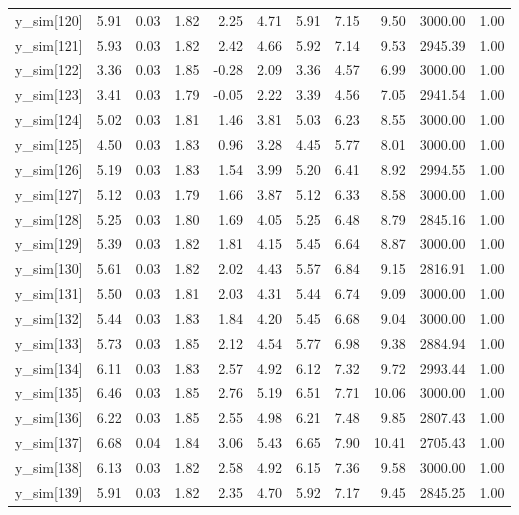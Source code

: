 \begin{table}[ht]
\begin{tabular}{rrrrrrrrrrr}
  y\_sim[120] & 5.91 & 0.03 & 1.82 & 2.25 & 4.71 & 5.91 & 7.15 & 9.50 & 3000.00 & 1.00 \\ 
  y\_sim[121] & 5.93 & 0.03 & 1.82 & 2.42 & 4.66 & 5.92 & 7.14 & 9.53 & 2945.39 & 1.00 \\ 
  y\_sim[122] & 3.36 & 0.03 & 1.85 & -0.28 & 2.09 & 3.36 & 4.57 & 6.99 & 3000.00 & 1.00 \\ 
  y\_sim[123] & 3.41 & 0.03 & 1.79 & -0.05 & 2.22 & 3.39 & 4.56 & 7.05 & 2941.54 & 1.00 \\ 
  y\_sim[124] & 5.02 & 0.03 & 1.81 & 1.46 & 3.81 & 5.03 & 6.23 & 8.55 & 3000.00 & 1.00 \\ 
  y\_sim[125] & 4.50 & 0.03 & 1.83 & 0.96 & 3.28 & 4.45 & 5.77 & 8.01 & 3000.00 & 1.00 \\ 
  y\_sim[126] & 5.19 & 0.03 & 1.83 & 1.54 & 3.99 & 5.20 & 6.41 & 8.92 & 2994.55 & 1.00 \\ 
  y\_sim[127] & 5.12 & 0.03 & 1.79 & 1.66 & 3.87 & 5.12 & 6.33 & 8.58 & 3000.00 & 1.00 \\ 
  y\_sim[128] & 5.25 & 0.03 & 1.80 & 1.69 & 4.05 & 5.25 & 6.48 & 8.79 & 2845.16 & 1.00 \\ 
  y\_sim[129] & 5.39 & 0.03 & 1.82 & 1.81 & 4.15 & 5.45 & 6.64 & 8.87 & 3000.00 & 1.00 \\ 
  y\_sim[130] & 5.61 & 0.03 & 1.82 & 2.02 & 4.43 & 5.57 & 6.84 & 9.15 & 2816.91 & 1.00 \\ 
  y\_sim[131] & 5.50 & 0.03 & 1.81 & 2.03 & 4.31 & 5.44 & 6.74 & 9.09 & 3000.00 & 1.00 \\ 
  y\_sim[132] & 5.44 & 0.03 & 1.83 & 1.84 & 4.20 & 5.45 & 6.68 & 9.04 & 3000.00 & 1.00 \\ 
  y\_sim[133] & 5.73 & 0.03 & 1.85 & 2.12 & 4.54 & 5.77 & 6.98 & 9.38 & 2884.94 & 1.00 \\ 
  y\_sim[134] & 6.11 & 0.03 & 1.83 & 2.57 & 4.92 & 6.12 & 7.32 & 9.72 & 2993.44 & 1.00 \\ 
  y\_sim[135] & 6.46 & 0.03 & 1.85 & 2.76 & 5.19 & 6.51 & 7.71 & 10.06 & 3000.00 & 1.00 \\ 
  y\_sim[136] & 6.22 & 0.03 & 1.85 & 2.55 & 4.98 & 6.21 & 7.48 & 9.85 & 2807.43 & 1.00 \\ 
  y\_sim[137] & 6.68 & 0.04 & 1.84 & 3.06 & 5.43 & 6.65 & 7.90 & 10.41 & 2705.43 & 1.00 \\ 
  y\_sim[138] & 6.13 & 0.03 & 1.82 & 2.58 & 4.92 & 6.15 & 7.36 & 9.58 & 3000.00 & 1.00 \\ 
  y\_sim[139] & 5.91 & 0.03 & 1.82 & 2.35 & 4.70 & 5.92 & 7.17 & 9.45 & 2845.25 & 1.00 \\ 

\end{tabular}
\end{table}

